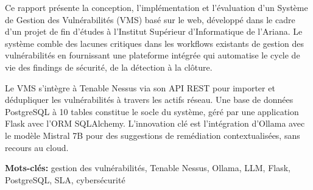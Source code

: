 Ce rapport présente la conception, l'implémentation et l'évaluation d'un Système de Gestion des Vulnérabilités (VMS) basé sur le web, développé dans le cadre d'un projet de fin d'études à l'Institut Supérieur d'Informatique de l'Ariana. Le système comble des lacunes critiques dans les workflows existants de gestion des vulnérabilités en fournissant une plateforme intégrée qui automatise le cycle de vie des findings de sécurité, de la détection à la clôture.

Le VMS s'intègre à Tenable Nessus via son API REST pour importer et dédupliquer les vulnérabilités à travers les actifs réseau. Une base de données PostgreSQL à 10 tables constitue le socle du système, géré par une application Flask avec l'ORM SQLAlchemy. L'innovation clé est l'intégration d'Ollama avec le modèle Mistral 7B pour des suggestions de remédiation contextualisées, sans recours au cloud.

\textbf{Mots-clés:} gestion des vulnérabilités, Tenable Nessus, Ollama, LLM, Flask, PostgreSQL, SLA, cybersécurité
\cleardoublepage
